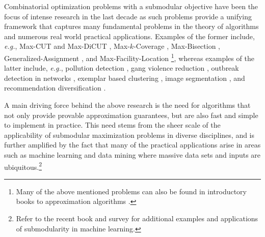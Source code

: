 \documentclass[a4paper,UKenglish,cleveref, autoref]{lipics-v2019}
\begin{document}
Combinatorial optimization problems with a submodular objective have been the focus of intense research in the last decade as such problems provide a unifying framework that captures many fundamental problems in the theory of algorithms and numerous real world practical applications.
Examples of the former include, {\em e.g.}, Max-CUT and Max-DiCUT \cite{FG95,GW95,HZ01,H01,K72,KKMO07,LLZ02,TSSW00}, Max-$k$-Coverage \cite{F98,SW11,V01}, Max-Bisection \cite{ABG13,FJ97,HZ02,Y01}, Generalized-Assignment \cite{CK05,CKR06,FGMS06,FV06}, and Max-Facility-Location \cite{AS99,CFN77a,CFN77b}\footnote{Many of the above mentioned problems can also be found in introductory books to approximation algorithms \cite{SW11,V01}.}, whereas examples of the latter include, {\em e.g.}, pollution detection \cite{KLGVF08}, gang violence reduction \cite{SSPB14}, outbreak detection in networks \cite{LKGFFVG07}, exemplar based clustering \cite{GK10}, image segmentation \cite{KXFK11}, and recommendation diversification \cite{YG11}.

A main driving force behind the above research is the need for algorithms that not only provide provable approximation guarantees, but are also fast and  simple to implement in practice.
This need stems from the sheer scale of the applicability of submodular maximization problems in diverse disciplines, and is further amplified by the fact that many of the practical applications arise in areas such as machine learning and data mining where massive data sets and inputs are ubiquitous.\footnote{Refer to the recent book \cite{B13} and survey \cite{KG14} for additional examples and applications of submodularity in machine learning.}
\end{document}
